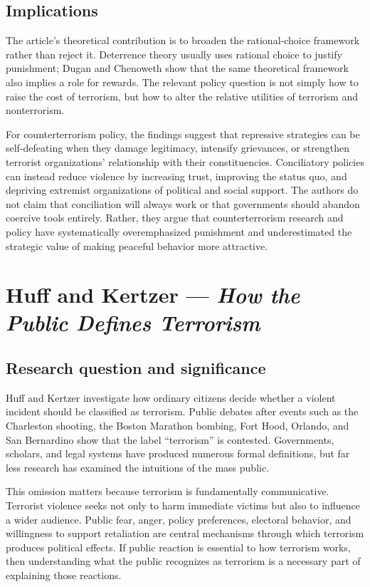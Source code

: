 \subsection{Implications}

The article's theoretical contribution is to broaden the rational-choice framework rather than reject it. Deterrence theory usually uses rational choice to justify punishment; Dugan and Chenoweth show that the same theoretical framework also implies a role for rewards. The relevant policy question is not simply how to raise the cost of terrorism, but how to alter the relative utilities of terrorism and nonterrorism.

For counterterrorism policy, the findings suggest that repressive strategies can be self-defeating when they damage legitimacy, intensify grievances, or strengthen terrorist organizations' relationship with their constituencies. Conciliatory policies can instead reduce violence by increasing trust, improving the status quo, and depriving extremist organizations of political and social support. The authors do not claim that conciliation will always work or that governments should abandon coercive tools entirely. Rather, they argue that counterterrorism research and policy have systematically overemphasized punishment and underestimated the strategic value of making peaceful behavior more attractive.


\clearpage
\section{Huff and Kertzer --- \textit{How the Public Defines Terrorism}}

\subsection{Research question and significance}

Huff and Kertzer investigate how ordinary citizens decide whether a violent incident should be classified as terrorism. Public debates after events such as the Charleston shooting, the Boston Marathon bombing, Fort Hood, Orlando, and San Bernardino show that the label ``terrorism'' is contested. Governments, scholars, and legal systems have produced numerous formal definitions, but far less research has examined the intuitions of the mass public.

This omission matters because terrorism is fundamentally communicative. Terrorist violence seeks not only to harm immediate victims but also to influence a wider audience. Public fear, anger, policy preferences, electoral behavior, and willingness to support retaliation are central mechanisms through which terrorism produces political effects. If public reaction is essential to how terrorism works, then understanding what the public recognizes as terrorism is a necessary part of explaining those reactions.

